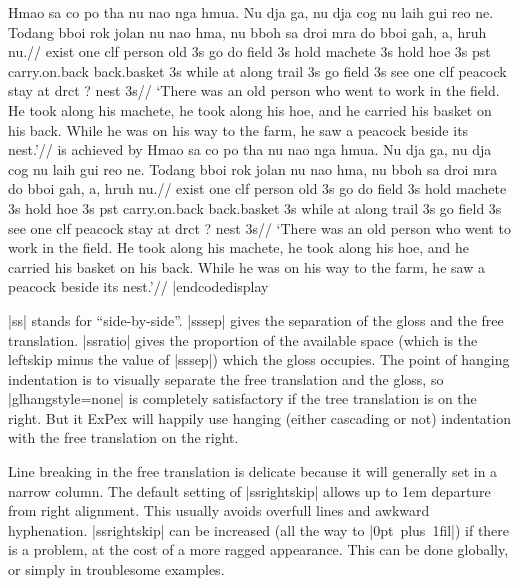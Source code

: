 
\framedisplay
\ex[glftpos=right,glhangstyle=none]
\begingl
\gla
Hmao sa co po tha  nu nao nga hmua. Nu dja ga, nu dja cog nu laih
gui reo ne. Todang bboi rok jolan nu nao hma, nu bboh sa droi mra
do bboi gah, a, hruh nu.//
\glb
exist one {clf} person old 3s go do field 3s hold machete 3s hold
hoe 3s pst carry.on.back back.basket 3s while at {along} trail 3s
go field 3s see one clf peacock stay at drct {?} nest 3s//
\glft
`There was an old person who went to work in the field. He took
along his machete, he took along his hoe, and he carried his
basket on his back. While he was on his way to the farm, he saw a
peacock beside its nest.'//
\endgl
\xe
\endframedisplay
\noindent is achieved by
\codedisplay
\ex[glftpos=right,glhangstyle=none]
\begingl
\gla
Hmao sa co po tha  nu nao nga hmua. Nu dja ga, nu dja cog nu laih
gui reo ne. Todang bboi rok jolan nu nao hma, nu bboh sa droi mra
do bboi gah, a, hruh nu.//
\glb
exist one {clf} person old 3s go do field 3s hold machete 3s hold
hoe 3s pst carry.on.back back.basket 3s while at {along} trail 3s
go field 3s see one clf peacock stay at drct {?} nest 3s//
\glft
`There was an old person who went to work in the field. He took
along his machete, he took along his hoe, and he carried his
basket on his back. While he was on his way to the farm, he saw a
peacock beside its nest.'//
\endgl
\xe
|endcodedisplay

|ss| stands for ``side-by-side''. |sssep| gives the separation of the
gloss and the free translation. |ssratio| gives the proportion of the
available space (which is the leftskip minus the value of |sssep|)
which the gloss occupies. The point of hanging indentation is to
visually separate the free translation and the gloss, so
|glhangstyle=none| is completely satisfactory if the tree translation
is on the right. But {it ExPex\/} will happily use hanging (either
cascading or not) indentation with the free translation on the right.

Line breaking in the free translation is delicate because it will
generally set in a narrow column. The default setting of |ssrightskip|
allows up to 1em departure from right alignment. This usually avoids
overfull lines and awkward hyphenation.  |ssrightskip| can be
increased (all the way to \hbox{|0pt plus 1fil|}) if there is a
problem, at the cost of a more ragged appearance.  This can be done
globally, or simply in troublesome examples.

